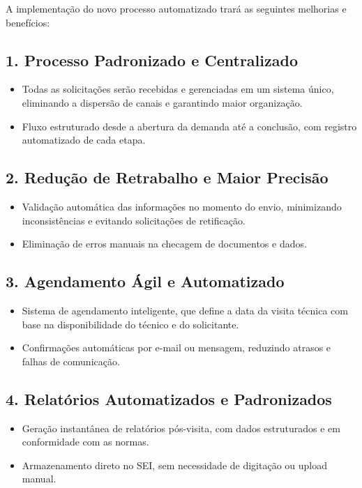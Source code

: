 \documentclass[12pt,a4paper]{article}
\begin{document}
A implementação do novo processo automatizado trará as seguintes melhorias e benefícios:

\subsection{1. Processo Padronizado e Centralizado}
\begin{itemize}
    \item Todas as solicitações serão recebidas e gerenciadas em um sistema único, eliminando a dispersão de canais e garantindo maior organização.
    \item Fluxo estruturado desde a abertura da demanda até a conclusão, com registro automatizado de cada etapa.
\end{itemize}

\subsection{2. Redução de Retrabalho e Maior Precisão}
\begin{itemize}
    \item Validação automática das informações no momento do envio, minimizando inconsistências e evitando solicitações de retificação.
    \item Eliminação de erros manuais na checagem de documentos e dados.
\end{itemize}

\subsection{3. Agendamento Ágil e Automatizado}
\begin{itemize}
    \item Sistema de agendamento inteligente, que define a data da visita técnica com base na disponibilidade do técnico e do solicitante.
    \item Confirmações automáticas por e-mail ou mensagem, reduzindo atrasos e falhas de comunicação.
\end{itemize}

\subsection{4. Relatórios Automatizados e Padronizados}
\begin{itemize}
    \item Geração instantânea de relatórios pós-visita, com dados estruturados e em conformidade com as normas.
    \item Armazenamento direto no SEI, sem necessidade de digitação ou upload manual.
\end{itemize}
\end{document}
